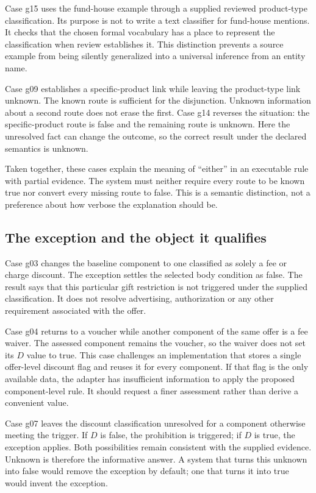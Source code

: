 Case g15 uses the fund-house example through a supplied reviewed product-type
classification. Its purpose is not to write a text classifier for fund-house
mentions. It checks that the chosen formal vocabulary has a place to represent
the classification when review establishes it. This distinction prevents a
source example from being silently generalized into a universal inference from
an entity name.

Case g09 establishes a specific-product link while leaving the product-type
link unknown. The known route is sufficient for the disjunction. Unknown
information about a second route does not erase the first. Case g14 reverses
the situation: the specific-product route is false and the remaining route is
unknown. Here the unresolved fact can change the outcome, so the correct result
under the declared semantics is unknown.

Taken together, these cases explain the meaning of ``either'' in an executable
rule with partial evidence. The system must neither require every route to be
known true nor convert every missing route to false. This is a semantic
distinction, not a preference about how verbose the explanation should be.

\subsection{The exception and the object it qualifies}
Case g03 changes the baseline component to one classified as solely a fee or
charge discount. The exception settles the selected body condition as false.
The result says that this particular gift restriction is not triggered under
the supplied classification. It does not resolve advertising, authorization or
any other requirement associated with the offer.

Case g04 returns to a voucher while another component of the same offer is a
fee waiver. The assessed component remains the voucher, so the waiver does not
set its $D$ value to true. This case challenges an implementation that stores a
single offer-level discount flag and reuses it for every component. If that flag
is the only available data, the adapter has insufficient information to apply
the proposed component-level rule. It should request a finer assessment rather
than derive a convenient value.

Case g07 leaves the discount classification unresolved for a component otherwise
meeting the trigger. If $D$ is false, the prohibition is triggered; if $D$ is
true, the exception applies. Both possibilities remain consistent with the
supplied evidence. Unknown is therefore the informative answer. A system that
turns this unknown into false would remove the exception by default; one that
turns it into true would invent the exception.

